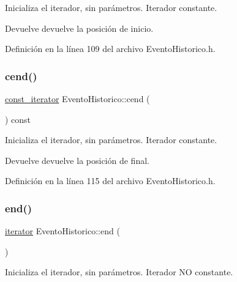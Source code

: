 Inicializa el iterador, sin parámetros. Iterador constante. 

\begin{DoxyReturn}{Devuelve}
devuelve la posición de inicio. 
\end{DoxyReturn}


Definición en la línea 109 del archivo Evento\+Historico.\+h.

\hypertarget{classEventoHistorico_ab217a30a72652cabb431d7b50c9904e9}{}\label{classEventoHistorico_ab217a30a72652cabb431d7b50c9904e9} 
\subsubsection{\texorpdfstring{cend()}{cend()}}
{\footnotesize\ttfamily \hyperlink{classEventoHistorico_1_1const__iterator}{const\+\_\+iterator} Evento\+Historico\+::cend (\begin{DoxyParamCaption}{ }\end{DoxyParamCaption}) const\hspace{0.3cm}{\ttfamily [inline]}}



Inicializa el iterador, sin parámetros. Iterador constante. 

\begin{DoxyReturn}{Devuelve}
devuelve la posición de final. 
\end{DoxyReturn}


Definición en la línea 115 del archivo Evento\+Historico.\+h.

\hypertarget{classEventoHistorico_ac0c4b9959e20bc695d6d14c85ffa058e}{}\label{classEventoHistorico_ac0c4b9959e20bc695d6d14c85ffa058e} 
\subsubsection{\texorpdfstring{end()}{end()}}
{\footnotesize\ttfamily \hyperlink{classEventoHistorico_1_1iterator}{iterator} Evento\+Historico\+::end (\begin{DoxyParamCaption}{ }\end{DoxyParamCaption})\hspace{0.3cm}{\ttfamily [inline]}}



Inicializa el iterador, sin parámetros. Iterador NO constante. 

